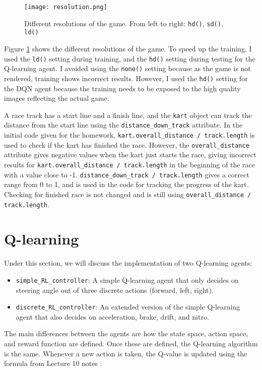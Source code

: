 \documentclass{article}
\begin{document}
\begin{figure}[htbp]
    \centering
    \texttt{[image: resolution.png]}
    \caption{Different resolutions of the game. From left to right: \texttt{hd()}, \texttt{sd()}, \texttt{ld()}}
    \label{resolution}
\end{figure}


Figure \ref{resolution} shows the different resolutions of the game. To speed up the training, I used the \texttt{ld()} setting during training, and the \texttt{hd()} setting during testing for the Q-learning agent. 
I avoided using the \texttt{none()} setting because as the game is not rendered, training shows incorrect results. However, I used the \texttt{hd()} setting
for the DQN agent because the training needs to be exposed to the high quality images reflecting the actual game.

A race track has a start line and a finish line, and the \texttt{kart} object can track the distance from the start line using the \texttt{distance\_down\_track} attribute. 
In the initial code given for the homework, \texttt{kart.overall\_distance / track.length} is used to check if the kart has finished the race. However, the \texttt{overall\_distance}
attribute gives negative values when the kart just starts the race, giving incorrect results for \texttt{kart.overall\_distance / track.length} in the beginning of the race with a value close to -1.
\texttt{distance\_down\_track / track.length} gives a correct range from 0 to 1, and is used in the code for tracking the progress of the kart. Checking for finished race is not changed and is
 still using \texttt{overall\_distance / track.length}.

\section{Q-learning}

Under this section, we will discuss the implementation of two Q-learning agents:
\begin{itemize}
    \item \texttt{simple\_RL\_controller}: A simple Q-learning agent that only decides on steering angle out of three discrete actions (forward, left, right).
    \item \texttt{discrete\_RL\_controller}: An extended version of the simple Q-learning agent that also decides on acceleration, brake, drift, and nitro.
\end{itemize}

The main differences between the agents are how the state space, action space, and reward function are defined. Once these are defined, the Q-learning algorithm is the same. Whenever a new action is taken, the Q-value is updated using the formula from Lecture 10 notes \citep{lecnotes}:
\end{document}
